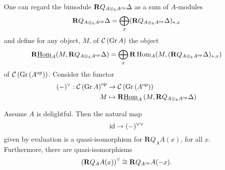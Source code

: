 One can regard the bimodule \(\mathbf{R}Q_{A \otimes_k A^{\operatorname{op}}}\Delta\) as a sum of \(A\)-modules
\[\mathbf{R}Q_{A \otimes_k A^{\operatorname{op}}}\Delta = \bigoplus_{x} (\mathbf{R}Q_{A \otimes_k A^{\operatorname{op}}}\Delta)_{\ast,x}\]
and define for any object, \(M\), of \(\mathcal{C}\left(\operatorname{Gr}A\right)\) the object
\[\mathbf{R}\underline{\operatorname{Hom}}_A(M, \mathbf{R}Q_{A \otimes_k A^{\operatorname{op}}}\Delta) = \bigoplus_x \mathbf{R}\operatorname{Hom}_A(M, (\mathbf{R}Q_{A \otimes_k A^{\operatorname{op}}}\Delta)_{\ast,x})\]
of \(\mathcal{C}\left(\operatorname{Gr}\left(A^{{\operatorname{op}}}\right)\right)\).
Consider the functor
\begin{align*}
  (-)^{\vee} : \mathcal{C}\left(\operatorname{Gr}A\right)^{\operatorname{op}} & \to \mathcal{C}\left(\operatorname{Gr}\left(A^{{\operatorname{op}}}\right)\right) \\
  M & \mapsto \mathbf{R}\underline{\operatorname{Hom}}_A \left( M , \mathbf{R}Q_{A \otimes_k A^{\operatorname{op}}} \Delta \right)
\end{align*}

\begin{lemma} \label{lemma: duality really is a duality}
  Assume \(A\) is delightful. Then the natural map 
  \begin{displaymath}
    \operatorname{id} \to (-)^{\vee \vee}
  \end{displaymath}
  given by evaluation is a quasi-isomorphism for \(\mathbf{R}Q_A A(x)\), for all \(x\). Furthermore, there are quasi-isomorphisms
  \begin{displaymath}
    \left( \mathbf{R}Q_A A(x) \right)^\vee \cong \mathbf{R}Q_{A^{\operatorname{op}}} A(-x).
  \end{displaymath}
\end{lemma}


